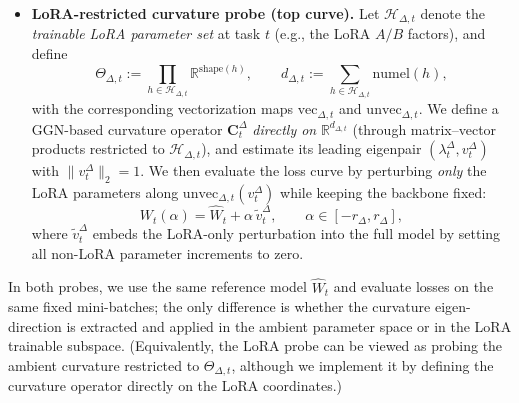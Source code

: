 \documentclass{article}
\theoremstyle{plain}
\theoremstyle{definition}
\theoremstyle{remark}
\begin{document}
\begin{itemize}
\item \textbf{LoRA-restricted curvature probe (top curve).}
Let $\mathcal H_{\Delta,t}$ denote the \emph{trainable LoRA parameter set} at task $t$ (e.g., the LoRA $A/B$ factors), and define
\[
\Theta_{\Delta,t}
:=
\prod_{h\in \mathcal H_{\Delta,t}}\mathbb R^{\mathrm{shape}(h)},
\qquad
d_{\Delta,t}:=\sum_{h\in \mathcal H_{\Delta,t}}\mathrm{numel}(h),
\]
with the corresponding vectorization maps $\mathrm{vec}_{\Delta,t}$ and $\mathrm{unvec}_{\Delta,t}$.
We define a GGN-based curvature operator $\mathbf C_t^\Delta$ \emph{directly on} $\mathbb R^{d_{\Delta,t}}$ (through matrix--vector products restricted to $\mathcal H_{\Delta,t}$), and estimate its leading eigenpair $(\lambda_t^\Delta,v_t^\Delta)$ with $\|v_t^\Delta\|_2=1$.
We then evaluate the loss curve by perturbing \emph{only} the LoRA parameters along $\mathrm{unvec}_{\Delta,t}(v_t^\Delta)$ while keeping the backbone fixed:
\[
W_t(\alpha)=\widehat W_t+\alpha\, \tilde v_t^{\Delta},
\qquad \alpha\in[-r_{\Delta},r_{\Delta}],
\]
where $\tilde v_t^{\Delta}$ embeds the LoRA-only perturbation into the full model by setting all non-LoRA parameter increments to zero.

\end{itemize}

\noindent
In both probes, we use the same reference model $\widehat W_t$ and evaluate losses on the same fixed mini-batches; the only difference is whether the curvature eigen-direction is extracted and applied in the ambient parameter space or in the LoRA trainable subspace.
(Equivalently, the LoRA probe can be viewed as probing the ambient curvature restricted to $\Theta_{\Delta,t}$, although we implement it by defining the curvature operator directly on the LoRA coordinates.)




\end{document}
